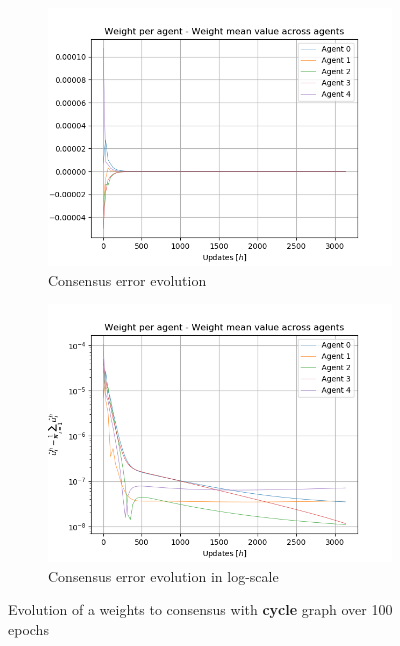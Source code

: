 \documentclass[a4paper,11pt,oneside]{book}
\begin{document}
\begin{figure}[H]
\centering
	\begin{subfigure}{0.49\textwidth}	
	\includegraphics[width=\textwidth]{cycle/weight_100}
	\caption{Consensus error evolution}
	\end{subfigure}
\hfill
	\begin{subfigure}{0.49\textwidth}	
	\includegraphics[width=\textwidth]{cycle/weight_100_log}
	\caption{Consensus error evolution in log-scale}
	\end{subfigure}
\caption{Evolution of a weights to consensus with \textbf{cycle} graph over 100 epochs}
\label{cycle_test}
\end{figure}
\end{document}
